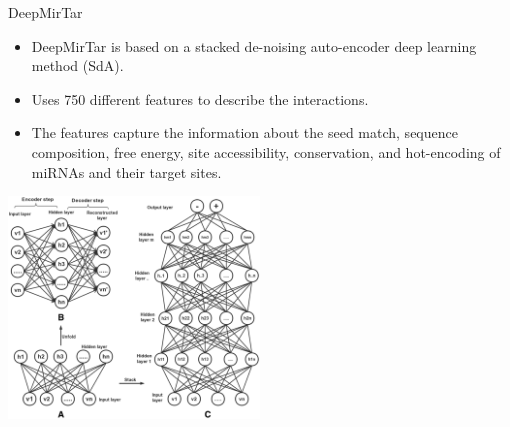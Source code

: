 \documentclass{beamer}
\begin{document}
\begin{frame}{DeepMirTar}
\begin{itemize}
\item DeepMirTar \cite{wen2018deepmirtar} is based on a stacked de-noising auto-encoder deep learning method (SdA).
\item Uses 750 different features to describe the interactions.
\item The features capture the information about the seed match, sequence composition, free energy, site accessibility, conservation, and hot-encoding of miRNAs and their target sites. 
\end{itemize}
\includegraphics[width=0.5\textwidth,keepaspectratio]{images/deepmirtarsda.png}

\end{frame}
\end{document}

